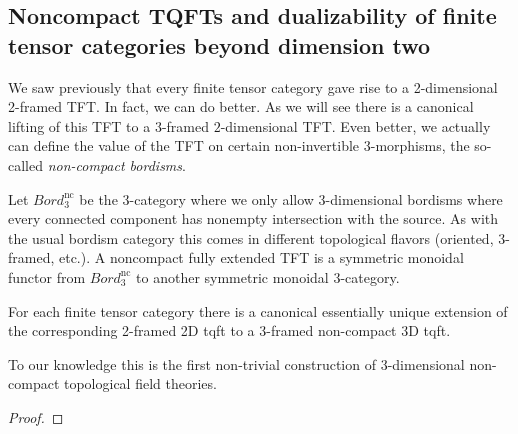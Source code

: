 \documentclass{amsart}
\begin{document}

\subsection{Noncompact TQFTs and dualizability of finite tensor categories beyond dimension two}


We saw previously that every finite tensor category gave rise to a 2-dimensional 2-framed TFT. In fact, we can do better.  As we will see there is a canonical lifting of this TFT to a $3$-framed $2$-dimensional TFT.  Even better, we actually can define the value of the TFT on certain non-invertible $3$-morphisms, the so-called {\em non-compact bordisms}.

\begin{definition}
Let $Bord_3^{\text{nc}}$ be the $3$-category where we only allow $3$-dimensional bordisms where every connected component has nonempty intersection with the source.  As with the usual bordism category this comes in different topological flavors (oriented, $3$-framed, etc.).  A noncompact fully extended TFT is a symmetric monoidal functor from $Bord_3^{\text{nc}}$ to another symmetric monoidal $3$-category.
\end{definition}

\begin{theorem}
	For each finite tensor category there is a canonical essentially unique extension of the corresponding 2-framed 2D tqft to a 3-framed non-compact 3D tqft.
\end{theorem}

\begin{remark}
	To our knowledge this is the first non-trivial construction of 3-dimensional non-compact topological field theories. 
\end{remark}

\begin{proof} 
\end{proof}
\end{document}
